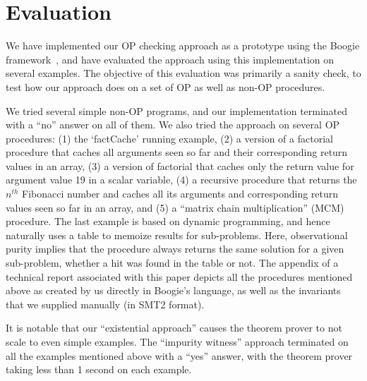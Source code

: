 \section{Evaluation}\label{sec:experiments}

We have implemented our OP checking approach as a prototype using the Boogie
framework~\cite{leino2008boogie}, and have evaluated the approach using
this implementation on several examples. The objective of this evaluation
was primarily a sanity check, to test how our approach does on a set of
OP as well as non-OP procedures.

We tried several simple non-OP programs, and our implementation terminated
with a ``no'' answer on all of them.  We also tried the approach on several
OP procedures: (1) the `factCache' running example, (2) a version of
a factorial procedure that caches all arguments seen so far and their
corresponding return values in an array, (3) a version of factorial that caches
only the return value for argument value 19 in a scalar variable, (4) a
recursive procedure that returns the $n^\mathit{th}$ Fibonacci number and
caches all its arguments and corresponding return values seen so far in an
array, and (5) a ``matrix chain multiplication'' (MCM) procedure.
The last example  is based
on dynamic programming, and hence naturally uses a table to memoize 
results for sub-problems. Here, observational purity implies that the procedure always
returns the same solution for a given sub-problem, whether a hit was found
in the table or not.  The appendix of a technical report associated with
this paper  depicts all the procedures
mentioned above as created by us directly in Boogie's language, as well as
the invariants that we supplied manually (in  SMT2
format).


It is notable that our ``existential approach'' causes the theorem prover
to not scale to even simple examples. The ``impurity witness'' approach
terminated on all the examples mentioned above with a ``yes'' answer,
with the theorem prover
taking less than 1 second on each example.

